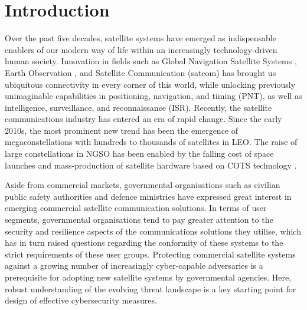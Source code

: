 \documentclass[english, 12pt, a4paper, elec, utf8, a-1b, online]{aaltothesis}
\begin{document}
\cleardoublepage

\section{Introduction}


Over the past five decades, satellite systems have emerged as indispensable enablers of our modern way of life within an increasingly technology-driven human society.
Innovation in fields such as Global Navigation Satellite Systems \cite{oconnor2019economic}, Earth Observation \cite{lupi2022socioeconomic, tassa2020socioeconomic}, and Satellite Communication (satcom) \cite{euspa-secure-satcom-2023, euroconsult-space-economy-2023} has brought us ubiquitous connectivity in every corner of this world, while unlocking previously unimaginable capabilities in positioning, navigation, and timing (PNT), as well as intelligence, surveillance, and reconnaissance (ISR).
Recently, the satellite communications industry has entered an era of rapid change.
Since the early 2010s, the most prominent new trend has been the emergence of megaconstellations with hundreds to thousands of satellites in LEO.
The raise of large constellations in NGSO has been enabled by the falling cost of space launches and mass-production of satellite hardware based on COTS technology \cite{euroconsult-space-economy-2023}.

Aside from commercial markets, governmental organisations such as civilian public safety authorities and defence ministries have expressed great interest in emerging commercial satellite communication solutions.
In terms of user segments, governmental organisations tend to pay greater attention to the security and resilience aspects of the communications solutions they utilise, which has in turn raised questions regarding the conformity of these systems to the strict requirements of these user groups.
Protecting commercial satellite systems against a growing number of increasingly cyber-capable adversaries is a prerequisite for adopting new satellite systems by governmental agencies.
Here, robust understanding of the evolving threat landscape is a key starting point for design of effective cybersecurity measures.
\end{document}
